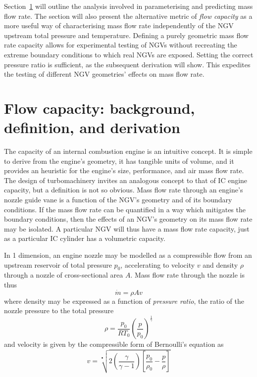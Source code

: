 \documentclass[a4paper, 11pt, oneside]{report}
\begin{document}
Section~\ref{flow_capacity_background_definition_and_derivation} will outline the analysis involved in parameterising and predicting mass flow rate. The section will also present the alternative metric of \textit{flow capacity} as a more useful way of characterising mass flow rate independently of the NGV upstream total pressure and temperature. Defining a purely geometric mass flow rate capacity allows for experimental testing of NGVs without recreating the extreme boundary conditions to which real NGVs are exposed. Setting the correct pressure ratio is sufficient, as the subsequent derivation will show. This expedites the testing of different NGV geometries' effects on mass flow rate.

\section{Flow capacity: background, definition, and derivation}
\label{flow_capacity_background_definition_and_derivation}

The capacity of an internal combustion engine is an intuitive concept. It is simple to derive from the engine's geometry, it has tangible units of volume, and it provides an heuristic for the engine's size, performance, and air mass flow rate. The design of turbomachinery invites an analogous concept to that of IC engine capacity, but a definition is not so obvious. Mass flow rate through an engine's nozzle guide vane is a function of the NGV's geometry and of its boundary conditions. If the mass flow rate can be quantified in a way which mitigates the boundary conditions, then the effects of an NGV's geometry on its mass flow rate may be isolated. A particular NGV will thus have a mass flow rate capacity, just as a particular IC cylinder has a volumetric capacity.

In 1 dimension, an engine nozzle may be modelled as a compressible flow from an upstream reservoir of total pressure $p_0$, accelerating to velocity $v$ and density $\rho$ through a nozzle of cross-sectional area $A$. Mass flow rate through the nozzle is thus
\begin{equation}
\dot{m} = \rho A v
\end{equation}
where density may be expressed as a function of \textit{pressure ratio}, the ratio of the nozzle pressure to the total pressure
\begin{equation}
\rho = \frac{p_0}{R T_0} \left(\frac{p}{p_0}\right)^\frac{1}{\gamma}
\end{equation}
and velocity is given by the compressible form of Bernoulli's equation as
\begin{equation}\label{compressible_bernouilli}
v =
\sqrt[•]{ 
	2 \left( \frac{\gamma}{\gamma - 1} \right) \left[ \frac{p_0}{\rho_0} - \frac{p}{\rho} \right] 
}
\end{equation}
\end{document}
